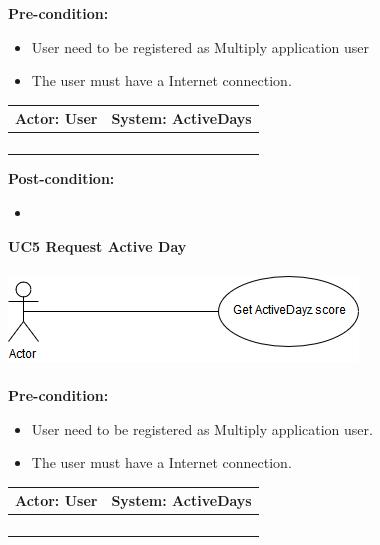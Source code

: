 \documentclass[11pt]{article}
\begin{document}
\textbf{Pre-condition: }   \\
\begin{itemize}
	\item User need to be registered as Multiply application user
	\item The user must have a Internet connection.
\end{itemize}
\begin{center}
	\begin{tabular}{ |p{8cm}|p{8cm}| }
		\hline
		\textbf{Actor:} User & \textbf{System:} ActiveDays \\
		\hline
		&  \\
		\hline
		&  \\
		\hline
		& \\   
		\hline
		& \\
		\hline
	\end{tabular}
\end{center}		
\textbf{Post-condition: } \\
\begin{itemize}
	\item 
\end{itemize}
\textbf{UC5 Request Active Day}\\\\
\includegraphics[scale=0.5]{./DiagramsAzhar/Beacon.png}\\\\
\textbf{Pre-condition: }   \\
\begin{itemize}
	\item User need to be registered as Multiply application user.
	\item The user must have a Internet connection.
\end{itemize}
\begin{center}
	\begin{tabular}{ |p{8cm}|p{8cm}| }
		\hline
		\textbf{Actor:} User & \textbf{System:} ActiveDays \\
		\hline
		&  \\
		\hline
		&  \\
		\hline
		& \\   
		\hline
		& \\
		\hline
	\end{tabular}
\end{center}		
\end{document}
